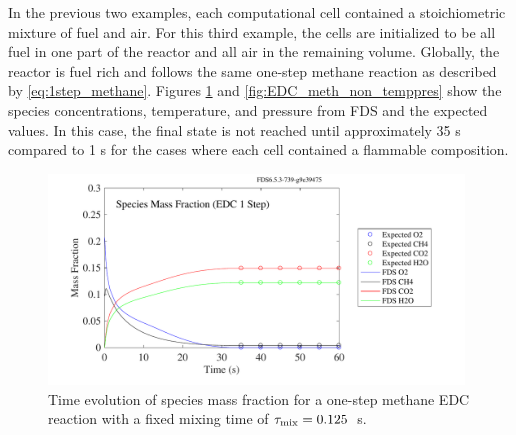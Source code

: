 \documentclass[11pt]{book}
\begin{document}
In the previous two examples, each computational cell contained a stoichiometric mixture of fuel and air. For this third example, the cells are initialized to be all fuel in one part of the reactor and all air in the remaining volume. Globally, the reactor is fuel rich and follows the same one-step methane reaction as described by \ref{eq:1step_methane}. Figures \ref{fig:EDC_meth_non_spec} and \ref{fig:EDC_meth_non_temppres} show the species concentrations, temperature, and pressure from FDS and the expected values. In this case, the final state is not reached until approximately 35 s compared to 1 s for the cases where each cell contained a flammable composition.

\begin{figure}[h!]
\begin{center}
\includegraphics[height=2.2in]{SCRIPT_FIGURES/reactionrate_EDC_1step_nonmix_spec}
\caption[Species evolution in 1-Step methane EDC reaction]{Time evolution of species mass fraction for a one-step methane EDC reaction with a fixed mixing time of $\tau_{\rm mix}=0.125$~s. }
\label{fig:EDC_meth_non_spec}
\end{center}
\end{figure}
\end{document}
